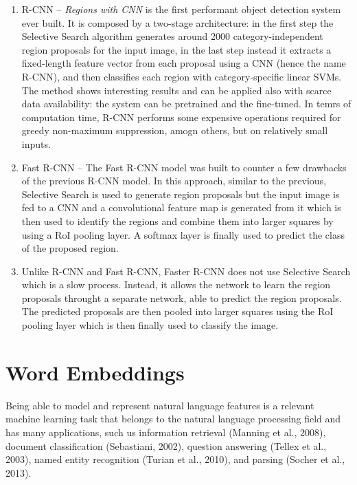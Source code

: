 \begin{enumerate}[label=(\alph*)]
  \item R-CNN -- \emph{Regions with CNN} is the first performant
  object detection system ever built. It is composed by a two-stage
  architecture: in the first step the Selective Search algorithm
  generates around 2000 category-independent region proposals for the
  input image, in the last step instead it extracts a fixed-length
  feature vector from each proposal using a CNN (hence the name
  R-CNN), and then classifies each region with category-specific
  linear SVMs. The method shows interesting results and can be applied
  also with scarce data availability: the system can be pretrained and
  the fine-tuned. In temrs of computation time, R-CNN performs some
  expensive operations required for greedy non-maximum suppression,
  amogn others, but on relatively small inputs.
  \item Fast R-CNN -- The Fast R-CNN model was built to counter a few
  drawbacks of the previous R-CNN model. In this approach, similar to
  the previous, Selective Search is used to generate region proposals
  but the input image is fed to a CNN and a convolutional feature map
  is generated from it which is then used to identify the regions and
  combine them into larger squares by using a RoI pooling layer. A
  softmax layer is finally used to predict the class of the proposed
  region.
  \item Unlike R-CNN and Fast R-CNN, Faster R-CNN does not use
  Selective Search which is a slow process. Instead, it allows the
  network to learn the region proposals throught a separate network,
  able to predict the region proposals. The predicted proposals are
  then pooled into larger squares using the RoI pooling layer which is
  then finally used to classify the image.
\end{enumerate}


\section{Word Embeddings}

Being able to model and represent natural language features is a
relevant machine learning task that belongs to the natural language
processing field and has many applications, such us information
retrieval (Manning et al., 2008), document classification (Sebastiani,
2002), question answering (Tellex et al., 2003), named entity
recognition (Turian et al., 2010), and parsing (Socher et al., 2013).

